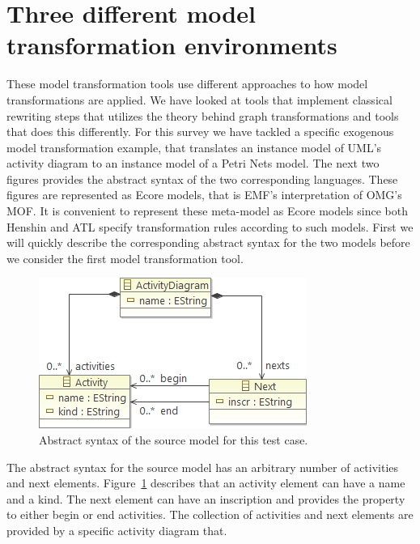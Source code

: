 \section{Three different model transformation environments}
\label{tools}

These model transformation tools use different approaches to how model
transformations are applied. We have looked at tools that implement classical
rewriting steps that utilizes the theory behind graph transformations and tools
that does this differently. For this survey we have tackled a specific
exogenous model transformation example, that translates an instance model of
UML's activity diagram to an instance model of a Petri
Nets\cite{jensen2007coloured} model. The next two figures provides the abstract
syntax of the two corresponding languages. These figures are represented as
Ecore models, that is EMF's interpretation of OMG's MOF. It is convenient to
represent these meta-model as Ecore models since both Henshin and ATL specify
transformation rules according to such models. First we will quickly describe
the corresponding abstract syntax for the two models before we consider the
first model transformation tool.

\begin{figure}[H]
	\centering
	\includegraphics[scale=0.7]{./Figures/ActivityMetamodel.png}
	\caption[Abstract syntax of the source model]
	{Abstract syntax of the source model for this test case.}
	\label{fig:activity_metamodel}
\end{figure}

The abstract syntax for the source model has an arbitrary number of
activities and next elements. Figure~\ref{fig:activity_metamodel} describes that an activity
element can have a name and a kind. The next element can have an inscription
and provides the property to either begin or end activities. The collection of
activities and next elements are provided by a specific activity diagram that.

